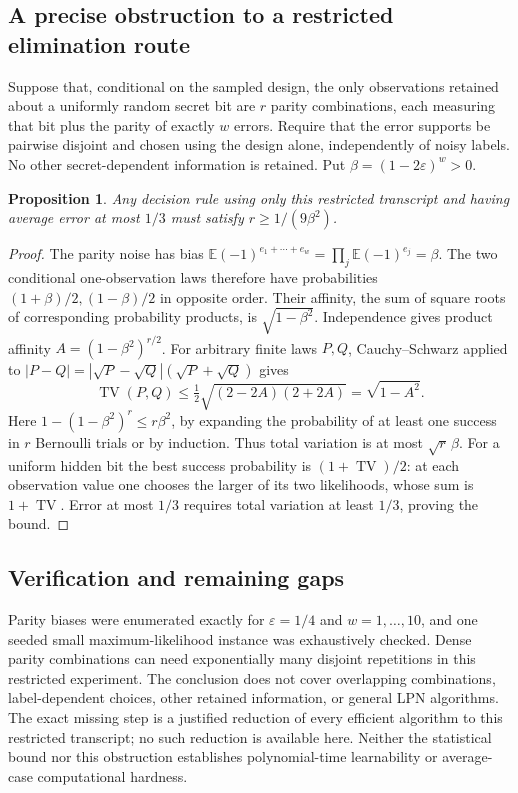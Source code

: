 \documentclass[11pt]{article}
\newtheorem{proposition}{Proposition}
\begin{document}
\subsection{A precise obstruction to a restricted elimination route}
Suppose that, conditional on the sampled design, the only observations retained about a uniformly random secret bit are $r$ parity combinations, each measuring that bit plus the parity of exactly $w$ errors. Require that the error supports be pairwise disjoint and chosen using the design alone, independently of noisy labels. No other secret-dependent information is retained. Put $\beta=(1-2\varepsilon)^w>0$.
\begin{proposition}
Any decision rule using only this restricted transcript and having average error at most $1/3$ must satisfy $r\ge1/(9\beta^2)$.
\end{proposition}
\begin{proof}
The parity noise has bias $\mathbb E(-1)^{e_1+\cdots+e_w}=\prod_j\mathbb E(-1)^{e_j}=\beta$. The two conditional one-observation laws therefore have probabilities $(1+\beta)/2,(1-\beta)/2$ in opposite order. Their affinity, the sum of square roots of corresponding probability products, is $\sqrt{1-\beta^2}$. Independence gives product affinity $A=(1-\beta^2)^{r/2}$. For arbitrary finite laws $P,Q$, Cauchy--Schwarz applied to $|P-Q|=|\sqrt P-\sqrt Q|(\sqrt P+\sqrt Q)$ gives
\[
\operatorname{TV}(P,Q)\le\tfrac12\sqrt{(2-2A)(2+2A)}=\sqrt{1-A^2}.
\]
Here $1-(1-\beta^2)^r\le r\beta^2$, by expanding the probability of at least one success in $r$ Bernoulli trials or by induction. Thus total variation is at most $\sqrt r\,\beta$. For a uniform hidden bit the best success probability is $(1+\operatorname{TV})/2$: at each observation value one chooses the larger of its two likelihoods, whose sum is $1+\operatorname{TV}$. Error at most $1/3$ requires total variation at least $1/3$, proving the bound.
\end{proof}
\subsection{Verification and remaining gaps}
Parity biases were enumerated exactly for $\varepsilon=1/4$ and $w=1,\ldots,10$, and one seeded small maximum-likelihood instance was exhaustively checked. Dense parity combinations can need exponentially many disjoint repetitions in this restricted experiment. The conclusion does not cover overlapping combinations, label-dependent choices, other retained information, or general LPN algorithms. The exact missing step is a justified reduction of every efficient algorithm to this restricted transcript; no such reduction is available here. Neither the statistical bound nor this obstruction establishes polynomial-time learnability or average-case computational hardness.
\end{document}
